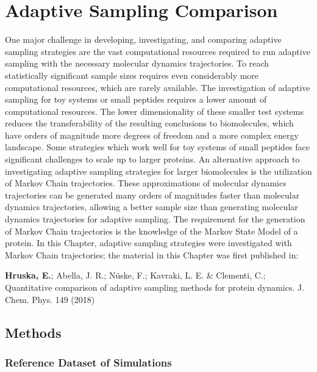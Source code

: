



\afterpage{\null\newpage}
\chapter{Adaptive Sampling Comparison\label{ch:chapter32}}

One major challenge in developing, investigating, and comparing adaptive sampling strategies are the vast computational resources required to run adaptive sampling with the necessary molecular dynamics trajectories. To reach statistically significant sample sizes requires even considerably more computational resources, which are rarely available.
The investigation of adaptive sampling for toy systems or small peptides requires a lower amount of computational resources. The lower dimensionality of these smaller test systems reduces the transferability of the resulting conclusions to biomolecules, which have orders of magnitude more degrees of freedom and a more complex energy landscape. Some strategies which work well for toy systems of small peptides face significant challenges to scale up to larger proteins. 
An alternative approach to investigating adaptive sampling strategies for larger biomolecules is the utilization of Markov Chain trajectories. These approximations of molecular dynamics trajectories can be generated many orders of magnitudes faster than molecular dynamics trajectories, allowing a better sample size than generating molecular dynamics trajectories for adaptive sampling. The requirement for the generation of Markov Chain trajectories is the knowledge of the Markov State Model of a protein.  In this Chapter, adaptive sampling strategies were investigated with Markov Chain trajectories; the material in this Chapter was first published in: 

\cite{Adstrategies2018} \textbf{Hruska, E.}; Abella, J. R.; N\"uske, F.;
Kavraki, L. E. \& Clementi, C.; Quantitative
comparison of adaptive sampling methods
for protein dynamics. J. Chem. Phys. 149 (2018) 



\section{\label{sec:methods}Methods}


\subsection{\label{sec:methods-dataset}Reference Dataset of Simulations}

